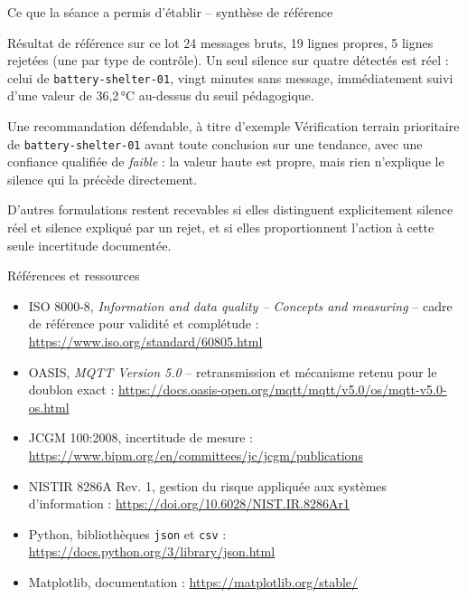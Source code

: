 \documentclass[aspectratio=169]{beamer}
\begin{document}
\begin{frame}{Ce que la séance a permis d'établir -- synthèse de référence}
  \small
  \begin{block}{Résultat de référence sur ce lot}
    24 messages bruts, 19 lignes propres, 5 lignes rejetées (une par type de contrôle). Un seul silence sur quatre détectés est réel : celui de \texttt{battery-shelter-01}, vingt minutes sans message, immédiatement suivi d'une valeur de 36,2\,°C au-dessus du seuil pédagogique.
  \end{block}
  \begin{block}{Une recommandation défendable, à titre d'exemple}
    Vérification terrain prioritaire de \texttt{battery-shelter-01} avant toute conclusion sur une tendance, avec une confiance qualifiée de \emph{faible} : la valeur haute est propre, mais rien n'explique le silence qui la précède directement.
  \end{block}
  \normalsize
  \alert{D'autres formulations restent recevables si elles distinguent explicitement silence réel et silence expliqué par un rejet, et si elles proportionnent l'action à cette seule incertitude documentée.}
\end{frame}

\begin{frame}{Références et ressources}
  \tiny
  \begin{itemize}
    \item ISO 8000-8, \emph{Information and data quality -- Concepts and measuring} -- cadre de référence pour validité et complétude : \url{https://www.iso.org/standard/60805.html}
    \item OASIS, \emph{MQTT Version 5.0} -- retransmission et mécanisme retenu pour le doublon exact : \url{https://docs.oasis-open.org/mqtt/mqtt/v5.0/os/mqtt-v5.0-os.html}
    \item JCGM 100:2008, incertitude de mesure : \url{https://www.bipm.org/en/committees/jc/jcgm/publications}
    \item NISTIR 8286A Rev. 1, gestion du risque appliquée aux systèmes d'information : \url{https://doi.org/10.6028/NIST.IR.8286Ar1}
    \item Python, bibliothèques \texttt{json} et \texttt{csv} : \url{https://docs.python.org/3/library/json.html}
    \item Matplotlib, documentation : \url{https://matplotlib.org/stable/}
  \end{itemize}
\end{frame}
\end{document}
